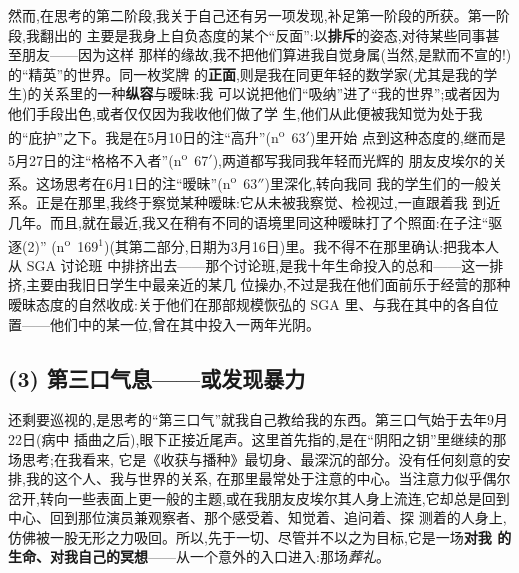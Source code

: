 然而,在思考的第二阶段,我关于自己还有另一项发现,补足第一阶段的所获。第一阶段,我翻出的
主要是我身上自负态度的某个“反面”:以\textbf{排斥}的姿态,对待某些同事甚至朋友——因为这样
那样的缘故,我不把他们算进我自觉身属(当然,是默而不宣的!)的“精英”的世界。同一枚奖牌
的\textbf{正面},则是我在同更年轻的数学家(尤其是我的学生)的关系里的一种\textbf{纵容}与暧昧:我
可以说把他们“吸纳”进了“我的世界”;或者因为他们手段出色,或者仅仅因为我收他们做了学
生,他们从此便被我知觉为处于我的“庇护”之下。我是在5月10日的注“高升”(n\textsuperscript{o}~63$'$)里开始
点到这种态度的,继而是5月27日的注“格格不入者”(n\textsuperscript{o}~67$'$),两道都写我同我年轻而\dmark{}光辉的
朋友皮埃尔的关系。这场思考在6月1日的注“暧昧”(n\textsuperscript{o}~63$''$)里深化,转向我同
我的学生们的一般关系。正是在那里,我终于察觉某种暧昧:它从未被我察觉、检视过,一直跟着我
到近几年。而且,就在最近,我又在稍有不同的语境里同这种暧昧打了个照面:在子注“驱逐(2)”
(n\textsuperscript{o}~169$^{1}$)(其第二部分,日期为3月16日)里。我不得不在那里确认:把我本人从 SGA 讨论班
中排挤出去——那个讨论班,是我十年生命投入的总和——这一排挤,主要由我旧日学生中最亲近的某几
位操办,不过是我在他们面前乐于经营的那种暧昧态度的自然收成:关于他们在那部规模恢弘的
SGA 里、与我在其中的各自位置——他们中的某一位,曾在其中投入一两年光阴。

\subsection{(3) 第三口气息——或发现暴力}   %


还剩要巡视的,是思考的“第三口气”就我自己教给我的东西。第三口气始于去年9月22日(病中
插曲之后),眼下正接近尾声。这里首先指的,是在“阴阳之钥”里继续的那场思考;在我看来,
它是《收获与播种》最切身、最深沉的部分。没有任何刻意的安排,我的这个人、我与世界的关系,
在那里最常处于注意的中心。当注意力似乎偶尔岔开,转向一些表面上更一般的主题,或在我朋友皮埃尔其人身上流连,它却总是回到中心、回到那位演员兼观察者、那个感受着、知觉着、追问着、探
测着的人身上,仿佛被一股无形之力吸回。所以,先于一切、尽管并不以之为目标,它是一场\textbf{对我
的生命、对我自己的冥想}——从一个意外的入口进入:那场\emph{葬礼}。

